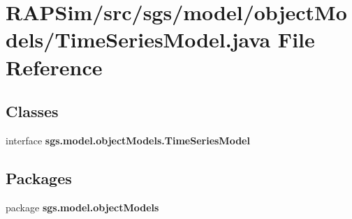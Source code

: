 \section{R\-A\-P\-Sim/src/sgs/model/object\-Models/\-Time\-Series\-Model.java File Reference}
\label{_time_series_model_8java}
\subsection*{Classes}
\begin{DoxyCompactItemize}
\item 
interface {\bf sgs.\-model.\-object\-Models.\-Time\-Series\-Model}
\end{DoxyCompactItemize}
\subsection*{Packages}
\begin{DoxyCompactItemize}
\item 
package {\bf sgs.\-model.\-object\-Models}
\end{DoxyCompactItemize}

